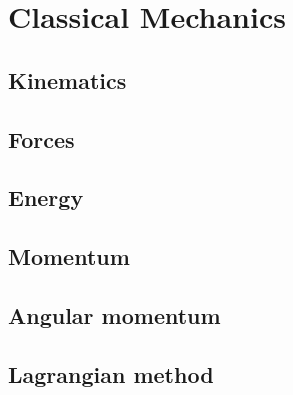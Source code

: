 \chapter{Classical Mechanics}
\section{Kinematics}
\section{Forces}
\section{Energy}
\section{Momentum}
\section{Angular momentum}
\section{Lagrangian method}
